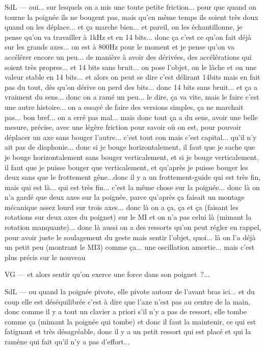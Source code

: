 SdL — oui... sur lesquels on a mis une toute petite friction... pour que quand on tourne la poignée ils ne bougent pas, mais qu'en même temps ils soient très doux quand on les déplace... et ça marche bien... et pareil, on les échantillonne, je pense qu'on va travailler à 1kHz et en 14 bits... donc ça c'est ce qu'on fait déjà sur les grands axes... on est à 800Hz pour le moment et je pense qu'on va accélérer encore un peu... de manière à avoir des dérivées, des accélérations qui soient très propres... et 14 bits sans bruit... on pose l'objet, on le lâche et on une valeur stable en 14 bits... et alors on peut se dire c'est délirant 14bits mais en fait pas du tout, dès qu'on dérive on perd des bits... donc 14 bits sans bruit... et ça a vraiment du sens... donc on a ramé un peu... le dire, ça va vite, mais le faire c'est une autre histoire... on a essayé de faire des versions simples, ça ne marchait pas... bon bref... on a erré pas mal... mais donc tout ça a du sens, avoir une belle mesure, précise, avec une légère friction pour savoir où on est, pour pouvoir déplacer un axe sans bouger l'autre... c'est tout con mais c'est capital... qu'il n'y ait pas de diaphonie... donc si je bouge horizontalement, il faut que je sache que je bouge horizontalement sans bouger verticalement, et si je bouge verticalement, il faut que je puisse bouger que verticalement, et qu'après je puisse bouger les deux sans que le frottement gêne...donc il y a un frottement-guide qui est très fin, mais qui est là... qui est très fin... c'est la même chose sur la poignée... donc là on n'a gardé que deux axes sur la poignée, parce qu'après ça faisait un montage mécanique assez lourd sur trois axes... donc là on a ça, ça et ça (faisant les rotations sur deux axes du poignet) sur le MI et on n'a pas celui là (mimant la rotation manquante)... donc là aussi on a des ressorts qu'on peut régler en rappel, pour avoir juste le soulagement du geste mais sentir l'objet, quoi... là on l'a déjà un petit peu (montrant le MI3)  comme ça... une oscillation amortie... mais c'est plus précis sur le nouveau 

VG — et alors sentir qu'on exerce une force dans son poignet ?... 

SdL — ou quand la poignée pivote, elle pivote autour de l'avant bras ici... et du coup elle est déséquilibrée c'est à dire que l'axe n'est pas au centre de la main, donc comme il y a tout un clavier a priori s'il n'y a pas de ressort, elle tombe comme ça (mimant la poignée qui tombe) et donc il faut la maintenir, ce qui est fatiguant et très désagréable, donc il y a un petit ressort qui est placé et qui la ramène qui fait qu'il n'y a pas d'effort... 


